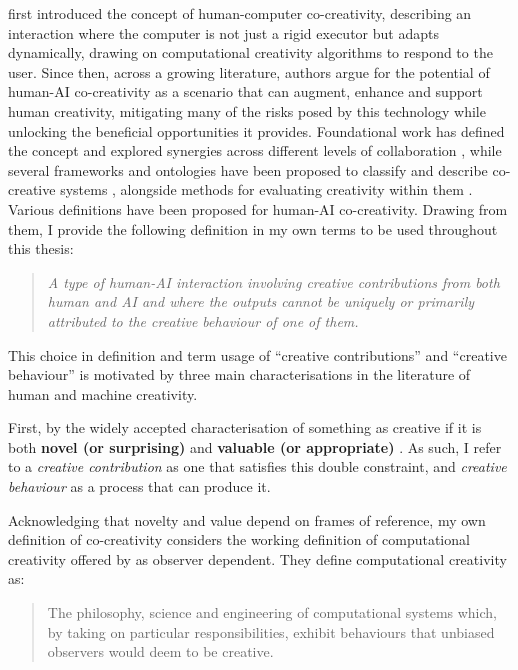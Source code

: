 \citet{Davis2013-jy} first introduced the concept of human-computer co-creativity, describing an interaction where the computer is not just a rigid executor but adapts dynamically, drawing on computational creativity algorithms to respond to the user. Since then, across a growing literature, authors argue for the potential of human-AI co-creativity as a scenario that can augment, enhance and support human creativity, mitigating many of the risks posed by this technology while unlocking the beneficial opportunities it provides. Foundational work has defined the concept and explored synergies across different levels of collaboration \citep{Yannakakis2014-zs, Haase2024-yp, Vinchon2023-gh}, while several frameworks and ontologies have been proposed to classify and describe co-creative systems \citep{Kantosalo2020-zf, Rezwana2022-gg, Lin2023-zq, Moruzzi2024-cq}, alongside methods for evaluating creativity within them \citep{Karimi2018-wi}. Various definitions have been proposed for human-AI co-creativity. Drawing from them, I provide the following definition in my own terms to be used throughout this thesis: 

\begin{quote}
\emph{A type of human-AI interaction involving creative contributions from both human and AI and where the outputs cannot be uniquely or primarily attributed to the creative behaviour of one of them.}
\end{quote}


This choice in definition and term usage of ``creative contributions'' and ``creative behaviour'' is motivated by three main characterisations in the literature of human and machine creativity. 

First, by the widely accepted characterisation of something as creative if it is both \textbf{novel (or surprising)} and \textbf{valuable (or appropriate)} \citep{Amabile1983-lj, Sternberg1998-oz, Runco2012-mk, Boden2003-hk}. As such, I refer to a \textit{creative contribution} as one that satisfies this double constraint, and \textit{creative behaviour} as a process that can produce it. 

Acknowledging that novelty and value depend on frames of reference, my own definition of co-creativity considers the working definition of computational creativity offered by \citet{Colton2012-fx} as observer dependent.  They define computational creativity as:

\begin{quote}
The philosophy, science and engineering of computational systems which, by taking on particular responsibilities, exhibit behaviours that unbiased observers would deem to be creative.
\end{quote}
 
